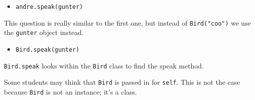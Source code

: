 \begin{solution}
\begin{blocksection}
\begin{itemize}
    \item \lstinline{andre.speak(gunter)}
\end{itemize}
This question is really similar to the first one, but instead of \lstinline{Bird("coo")} we use the \lstinline{gunter} object instead.

\begin{itemize}
    \item \lstinline{Bird.speak(gunter)}
\end{itemize}
\lstinline{Bird.speak} looks within the \lstinline{Bird} class to find the speak method. 
\end{blocksection}
\end{solution}

\begin{guide}
\begin{blocksection}
    Some students may think that \lstinline{Bird} is passed in for \lstinline{self}. This is not the case because \lstinline{Bird} is not an instance; it’s a class.
    \end{blocksection}
\end{guide}

